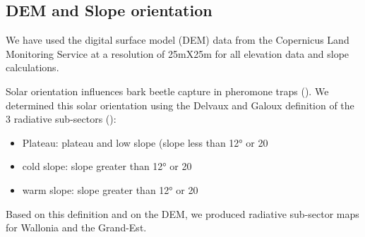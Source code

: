 \documentclass[3p,times]{elsarticle}
\begin{document}
	



\subsection{DEM and Slope orientation}


We have used the digital surface model (DEM) data from the Copernicus Land Monitoring Service \citep{DEM_copernicus}  at a resolution of 25mX25m for all elevation data and slope calculations.


Solar orientation influences bark beetle capture in pheromone traps (\citep{AFR64}). We determined this solar orientation using the Delvaux and Galoux definition of the 3 radiative sub-sectors  (\citep{Delvaux_galoux}):
\begin{itemize} 
\item Plateau: plateau and low slope (slope less than 12° or 20%
\item cold slope: slope greater than 12° or 20%
\item warm slope: slope greater than 12° or 20%
\end{itemize}
Based on this definition and on the DEM, we produced radiative sub-sector maps for Wallonia and the Grand-Est.
\end{document}
